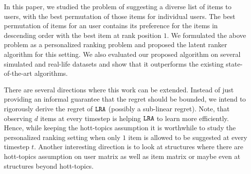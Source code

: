In this paper, we studied the problem of suggesting a diverse list of items to users, with the best permutation of those items for individual users. The best permutation of items for an user contains its preference for the items in descending order with the best item at rank position $1$. We formulated the above problem as a personalized ranking problem and proposed the latent ranker algorithm for this setting. We also evaluated our proposed algorithm on several simulated and real-life datasets and show that it outperforms the existing state-of-the-art algorithms.


There are several directions where this work can be extended. Instead of just providing an informal guarantee that the regret should be bounded, we intend to rigorously derive the regret of ${\tt LRA}$ (possibly a sub-linear regret). Note, that observing $d$ items at every timestep is helping ${\tt LRA}$ to learn more efficiently. Hence,  while keeping the hott-topics assumption it is worthwhile to study the personalized ranking setting when only $1$ item is allowed to be suggested at every timestep $t$. Another interesting direction is to look at structures where there are hott-topics assumption on user matrix as well as item matrix or maybe even at structures beyond hott-topics.

